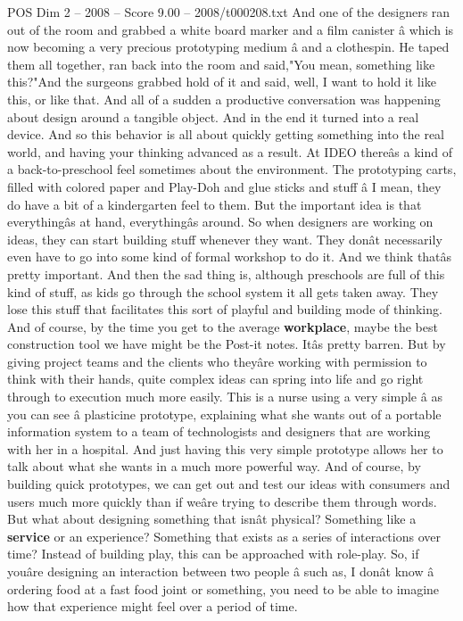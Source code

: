 \begin{textsample}{POS Dim 2 – 2008 – Score 9.00 – 2008/t000208.txt}
And one of the designers ran out of the room and grabbed a white board marker and a film canister â which is now becoming a very precious prototyping medium â and a clothespin.
He taped them all together, ran back into the room and said,"You mean, something like this?"And the surgeons grabbed hold of it and said, well, I want to hold it like this, or like that.
And all of a sudden a productive conversation was happening about design around a tangible object.
And in the end it turned into a real device.
And so this behavior is all about quickly getting something into the real world, and having your thinking advanced as a result.
At IDEO thereâs a kind of a back-to-preschool feel sometimes about the environment.
The prototyping carts, filled with colored paper and Play-Doh and glue sticks and stuff â I mean, they do have a bit of a kindergarten feel to them.
But the important idea is that everythingâs at hand, everythingâs around.
So when designers are working on ideas, they can start building stuff whenever they want.
They donât necessarily even have to go into some kind of formal workshop to do it.
And we think thatâs pretty important.
And then the sad thing is, although preschools are full of this kind of stuff, as kids go through the school system it all gets taken away.
They lose this stuff that facilitates this sort of playful and building mode of thinking.
And of course, by the time you get to the average \textbf{workplace}, maybe the best construction tool we have might be the Post-it notes.
Itâs pretty barren.
But by giving project teams and the clients who theyâre working with permission to think with their hands, quite complex ideas can spring into life and go right through to execution much more easily.
This is a nurse using a very simple â as you can see â plasticine prototype, explaining what she wants out of a portable information system to a team of technologists and designers that are working with her in a hospital.
And just having this very simple prototype allows her to talk about what she wants in a much more powerful way.
And of course, by building quick prototypes, we can get out and test our ideas with consumers and users much more quickly than if weâre trying to describe them through words.
But what about designing something that isnât physical?
Something like a \textbf{service} or an experience?
Something that exists as a series of interactions over time?
Instead of building play, this can be approached with role-play.
So, if youâre designing an interaction between two people â such as, I donât know â ordering food at a fast food joint or something, you need to be able to imagine how that experience might feel over a period of time.

\end{textsample}

